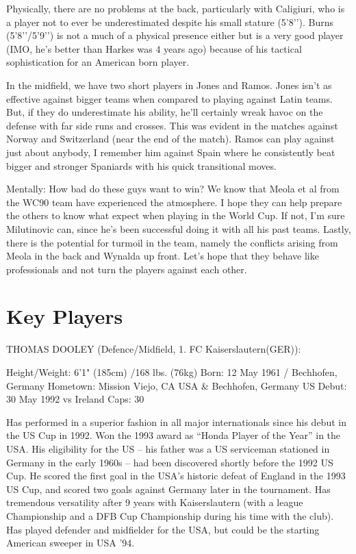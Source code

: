 Physically, there are no problems at the back, particularly with Caligiuri, who
is a player not to ever be underestimated despite his small stature (5’8’’). 
Burns (5’8’’/5’9’’) is not a much of a physical presence either but is a very 
good player (IMO, he's better than Harkes was 4 years ago) because of his 
tactical sophistication for an American born player.

In the midfield, we have two short players in Jones and Ramos. Jones isn't as 
effective against bigger teams when compared to playing against Latin teams. 
But, if they do underestimate his ability, he'll certainly wreak havoc on the 
defense with far side runs and crosses. This was evident in the matches against
Norway and Switzerland (near the end of the match). Ramos can play against just
about anybody, I remember him against Spain where he consistently beat bigger 
and stronger Spaniards with his quick transitional moves.

Mentally: How bad do these guys want to win? We know that Meola et al from the 
WC90 team have experienced the atmosphere. I hope they can help prepare the 
others to know what expect when playing in the World Cup. If not, I'm sure 
Milutinovic can, since he's been successful doing it with all his past teams. 
Lastly, there is the potential for turmoil in the team, namely the conflicts 
arising from Meola in the back and Wynalda up front. Let's hope that they 
behave like professionals and not turn the players against each other.

\section{Key Players}

THOMAS DOOLEY (Defence/Midfield, 1. FC Kaiserslautern(GER)):

Height/Weight: 6'1" (185cm) /168 lbs. (76kg)
Born: 12 May 1961 / Bechhofen, Germany
Hometown: Mission Viejo, CA USA \& Bechhofen, Germany
US Debut: 30 May 1992 vs Ireland
Caps: 30

Has performed in a superior fashion in all major internationals since his debut
in the US Cup in 1992. Won the 1993 award as ``Honda Player of the Year'' in the 
USA. His eligibility for the US -- his father was a US serviceman stationed in 
Germany in the early 1960s -- had been discovered shortly before the 1992 US 
Cup. He scored the first goal in the USA's historic defeat of England in the 
1993 US Cup, and scored two goals against Germany later in the tournament. Has 
tremendous versatility after 9 years with Kaiserslautern (with a league 
Championship and a DFB Cup Championship during his time with the club). Has 
played defender and midfielder for the USA, but could be the starting American 
sweeper in USA '94.


